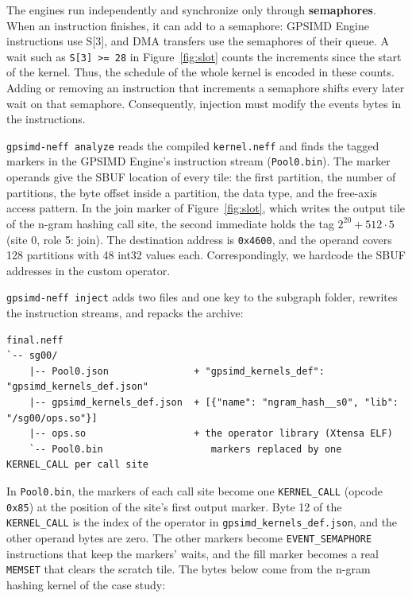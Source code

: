 \documentclass{article}
\newcommand{\code}[1]{\texttt{#1}}
\begin{document}
The engines run independently and synchronize only through \textbf{semaphores}. When an instruction finishes, it can add to a semaphore: GPSIMD Engine instructions use S[3], and DMA transfers use the semaphores of their queue. A wait such as \code{S[3] >= 28} in Figure~\ref{fig:slot} counts the increments since the start of the kernel. Thus, the schedule of the whole kernel is encoded in these counts. Adding or removing an instruction that increments a semaphore shifts every later wait on that semaphore. Consequently, injection must modify the events bytes in the instructions.

\code{gpsimd-neff analyze} reads the compiled \code{kernel.neff} and finds the tagged markers in the GPSIMD Engine's instruction stream (\code{Pool0.bin}). The marker operands give the SBUF location of every tile: the first partition, the number of partitions, the byte offset inside a partition, the data type, and the free-axis access pattern. In the join marker of Figure~\ref{fig:slot}, which writes the output tile of the n-gram hashing call site, the second immediate holds the tag $2^{20} + 512\cdot 5$ (site 0, role 5: join). The destination address is \code{0x4600}, and the operand covers 128 partitions with 48 int32 values each. Correspondingly, we hardcode the SBUF addresses in the custom operator.

\code{gpsimd-neff inject} adds two files and one key to the subgraph folder, rewrites the instruction streams, and repacks the archive:

\begin{lstlisting}
final.neff
`-- sg00/
    |-- Pool0.json               + "gpsimd_kernels_def": "gpsimd_kernels_def.json"
    |-- gpsimd_kernels_def.json  + [{"name": "ngram_hash__s0", "lib": "/sg00/ops.so"}]
    |-- ops.so                   + the operator library (Xtensa ELF)
    `-- Pool0.bin                   markers replaced by one KERNEL_CALL per call site
\end{lstlisting}

In \code{Pool0.bin}, the markers of each call site become one \code{KERNEL\_CALL} (opcode \code{0x85}) at the position of the site's first output marker. Byte 12 of the \code{KERNEL\_CALL} is the index of the operator in \code{gpsimd\_kernels\_def.json}, and the other operand bytes are zero. The other markers become \code{EVENT\_SEMAPHORE} instructions that keep the markers' waits, and the fill marker becomes a real \code{MEMSET} that clears the scratch tile. The bytes below come from the n-gram hashing kernel of the case study:
\end{document}
